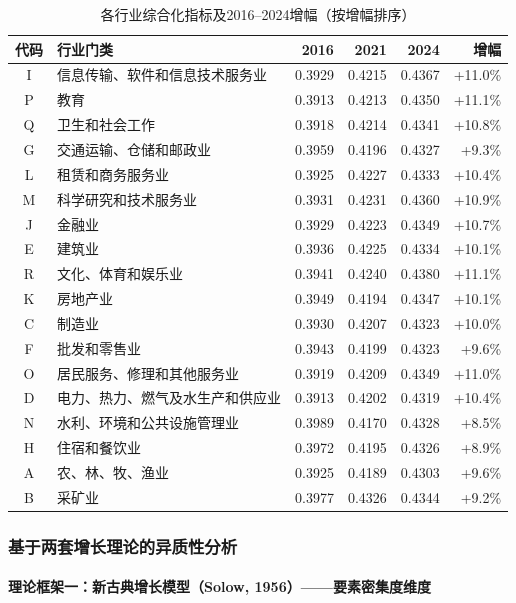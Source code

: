 \documentclass[12pt,a4paper]{ctexart}
\begin{document}
\begin{table}[H]
\centering
\caption{各行业综合化指标及2016--2024增幅（按增幅排序）}
\begin{tabular}{clrrrr}
\toprule
代码 & 行业门类 & 2016 & 2021 & 2024 & 增幅 \\
\midrule
I & 信息传输、软件和信息技术服务业 & 0.3929 & 0.4215 & 0.4367 & +11.0\% \\
P & 教育 & 0.3913 & 0.4213 & 0.4350 & +11.1\% \\
Q & 卫生和社会工作 & 0.3918 & 0.4214 & 0.4341 & +10.8\% \\
G & 交通运输、仓储和邮政业 & 0.3959 & 0.4196 & 0.4327 & +9.3\% \\
L & 租赁和商务服务业 & 0.3925 & 0.4227 & 0.4333 & +10.4\% \\
M & 科学研究和技术服务业 & 0.3931 & 0.4231 & 0.4360 & +10.9\% \\
J & 金融业 & 0.3929 & 0.4223 & 0.4349 & +10.7\% \\
E & 建筑业 & 0.3936 & 0.4225 & 0.4334 & +10.1\% \\
R & 文化、体育和娱乐业 & 0.3941 & 0.4240 & 0.4380 & +11.1\% \\
K & 房地产业 & 0.3949 & 0.4194 & 0.4347 & +10.1\% \\
C & 制造业 & 0.3930 & 0.4207 & 0.4323 & +10.0\% \\
F & 批发和零售业 & 0.3943 & 0.4199 & 0.4323 & +9.6\% \\
O & 居民服务、修理和其他服务业 & 0.3919 & 0.4209 & 0.4349 & +11.0\% \\
D & 电力、热力、燃气及水生产和供应业 & 0.3913 & 0.4202 & 0.4319 & +10.4\% \\
N & 水利、环境和公共设施管理业 & 0.3989 & 0.4170 & 0.4328 & +8.5\% \\
H & 住宿和餐饮业 & 0.3972 & 0.4195 & 0.4326 & +8.9\% \\
A & 农、林、牧、渔业 & 0.3925 & 0.4189 & 0.4303 & +9.6\% \\
B & 采矿业 & 0.3977 & 0.4326 & 0.4344 & +9.2\% \\
\bottomrule
\end{tabular}
\end{table}

\subsubsection{基于两套增长理论的异质性分析}

\paragraph{理论框架一：新古典增长模型（Solow, 1956）——要素密集度维度}
\end{document}
